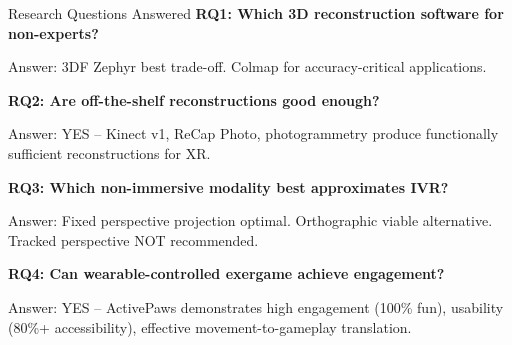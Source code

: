 \begin{frame}{Research Questions Answered}
	\textbf{\textcolor{gbAqua}{RQ1: Which 3D reconstruction software for non-experts?}}
	
	\alert{Answer:} 3DF Zephyr best trade-off. Colmap for accuracy-critical applications.
	
	\vspace{0.2cm}
	
	\textbf{\textcolor{gbAqua}{RQ2: Are off-the-shelf reconstructions good enough?}}
	
	\alert{Answer:} YES – Kinect v1, ReCap Photo, photogrammetry produce functionally sufficient reconstructions for XR.
	
	\vspace{0.2cm}
	
	\textbf{\textcolor{gbAqua}{RQ3: Which non-immersive modality best approximates IVR?}}
	
	\alert{Answer:} Fixed perspective projection optimal. Orthographic viable alternative. Tracked perspective NOT recommended.
	
	\vspace{0.2cm}
	
	\textbf{\textcolor{gbAqua}{RQ4: Can wearable-controlled exergame achieve engagement?}}
	
	\alert{Answer:} YES – ActivePaws demonstrates high engagement (100\% fun), usability (80\%+ accessibility), effective movement-to-gameplay translation.
\end{frame}

